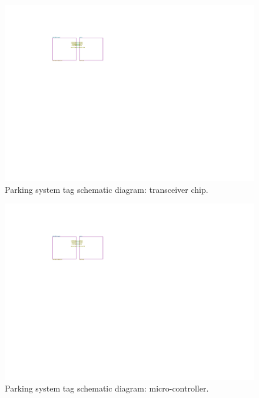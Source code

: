 \begin{figure}[H]
\begin{center}
\includegraphics[page=2,scale=0.5,trim={0cm 0cm 0cm 0cm},clip]{data/parking-system.pdf}
\caption{Parking system tag schematic diagram: transceiver chip.}
\end{center}
\end{figure}

\begin{figure}[H]
\begin{center}
\includegraphics[page=3,scale=1,trim={10cm 8cm 10cm 5cm},clip]{data/parking-system.pdf}
\caption{Parking system tag schematic diagram: micro-controller.}
\end{center}
\end{figure}

